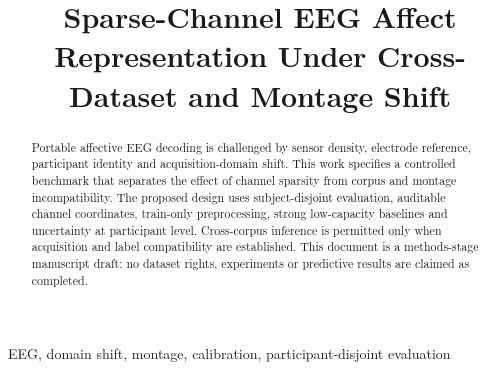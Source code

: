 \documentclass[conference]{IEEEtran}
\title{Sparse-Channel EEG Affect Representation Under Cross-Dataset and Montage Shift}
\author{\IEEEauthorblockN{Author information to be confirmed}\IEEEauthorblockA{Institutional affiliation to be confirmed}}
\begin{document}
\maketitle
\begin{abstract}
Portable affective EEG decoding is challenged by sensor density, electrode reference, participant identity and acquisition-domain shift. This work specifies a controlled benchmark that separates the effect of channel sparsity from corpus and montage incompatibility. The proposed design uses subject-disjoint evaluation, auditable channel coordinates, train-only preprocessing, strong low-capacity baselines and uncertainty at participant level. Cross-corpus inference is permitted only when acquisition and label compatibility are established. This document is a methods-stage manuscript draft: no dataset rights, experiments or predictive results are claimed as completed.
\end{abstract}
\begin{IEEEkeywords}
EEG, domain shift, montage, calibration, participant-disjoint evaluation
\end{IEEEkeywords}






\end{document}
